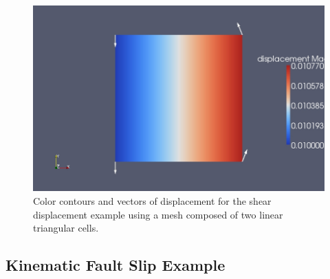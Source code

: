 \noindent \begin{center}
\begin{figure}
\begin{centering}
\includegraphics[scale=0.33]{tutorials/twocells/figs/twotri3-sheardisp}
\par\end{centering}

\caption{Color contours and vectors of displacement for the shear displacement
example using a mesh composed of two linear triangular cells.\label{fig:twotri-shear}}
\end{figure}

\par\end{center}


\subsection{Kinematic Fault Slip Example}

